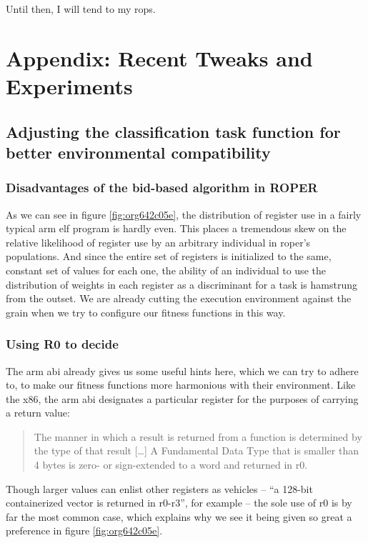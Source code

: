 \documentclass[12pt,glossary]{dalthesis}
\begin{document}
Until then, I will tend to my \glspl{rop}.


\appendix
\chapter{Appendix: Recent Tweaks and Experiments}
\label{sec:org3219a71}
\section{Adjusting the classification task function for better environmental compatibility}
\label{sec:org4165076}
\subsection{Disadvantages of the bid-based algorithm in ROPER}
\label{sec:orgcd30224}
As we can see in figure \ref{fig:org642c05e}, the distribution of register use
in a fairly typical \gls{arm} \gls{elf} program is hardly even. This places a tremendous skew
on the relative likelihood of register use by an arbitrary individual in \gls{roper}'s
populations. And since the entire set of registers is initialized to the same, constant
set of values for each one, the ability of an individual to use the distribution of weights
in each register as a discriminant for a task is hamstrung from the outset. We are already
cutting the execution environment against the grain when we try to configure our
fitness functions in this way.
\subsection{Using R0 to decide}
\label{sec:org3b8343a}
\label{orge2262c2}
The \gls{arm} \gls{abi} \cite{arm_abi} already gives us some useful hints here, which we can try to adhere to, to
make our fitness functions more harmonious with their environment. Like the x86, the \gls{arm}
\gls{abi} designates a particular register for the purposes of carrying a return value:
\begin{quote}
The manner in which a result is returned from a function is determined by the type of that
result [\ldots{}] A Fundamental Data Type that is smaller than 4 bytes is zero- or sign-extended
to a word and returned in r0.
\end{quote}
Though larger values can enlist other registers as vehicles -- ``a 128-bit containerized vector
is returned in r0-r3'', for example -- the sole use of r0 is by far the most common case, which
explains why we see it being given so great a preference in figure \ref{fig:org642c05e}. 
\end{document}
